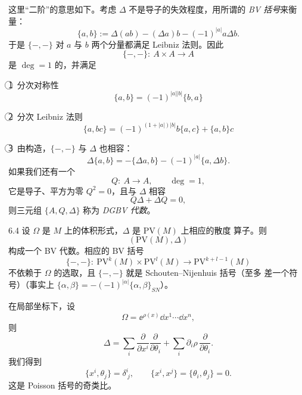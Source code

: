 这里“二阶”的意思如下。考虑 $\Delta$ 不是导子的失效程度，用所谓的
\emph{BV 括号}来衡量：
\[
  \{a,b\}:=\Delta(ab)-(\Delta a)b-(-1)^{|a|}a\Delta b.
\]
于是 $\{-,-\}$ 对 $a$ 与 $b$ 两个分量都满足 Leibniz 法则。因此
\[
  \{-,-\}:\ A\times A\longrightarrow A
\]
是 $\deg=1$ 的，并满足

\textcircled{1}\ 分次对称性
\[
  \{a,b\}=(-1)^{|a||b|}\{b,a\}
\]

\textcircled{2}\ 分次 Leibniz 法则
\[
  \{a,bc\}=(-1)^{(1+|a|)|b|}b\{a,c\}+\{a,b\}c
\]

\textcircled{3}\ 由构造，$\{-,-\}$ 与 $\Delta$ 也相容：
\[
  \Delta\{a,b\}=-\{\Delta a,b\}-(-1)^{|a|}\{a,\Delta b\}.
\]
如果我们还有一个
\[
  Q:\ A\longrightarrow A,\qquad \deg=1,
\]
它是导子、平方为零 $Q^2=0$，且与 $\Delta$ 相容
\[
  Q\Delta+\Delta Q=0,
\]
则三元组 $\{A,Q,\Delta\}$ 称为 \emph{DGBV 代数}。



\begin{wexam}{6.4}
设 $\Omega$ 是 $M$ 上的体积形式，$\Delta$ 是 $\mathrm{PV}(M)$ 上相应的散度
算子。则
\[
  (\mathrm{PV}(M),\Delta)
\]
构成一个 BV 代数。相应的 BV 括号
\[
  \{-,-\}:\ \mathrm{PV}^k(M)\times\mathrm{PV}^l(M)
  \longrightarrow\mathrm{PV}^{k+l-1}(M)
\]
不依赖于 $\Omega$ 的选取，且 $\{-,-\}$ 就是 Schouten--Nijenhuis 括号（至多
差一个符号）（事实上
$\{\alpha,\beta\}=-(-1)^{|\alpha|}\{\alpha,\beta\}_{SN}$）。

在局部坐标下，设
\[
  \Omega=\ee^{\rho(x)}\dd x^1\cdots\dd x^n,
\]
则
\[
  \Delta=\sum_i\frac{\partial}{\partial x^i}
  \frac{\partial}{\partial\theta_i}
  +\sum_i\partial_i\rho\,\frac{\partial}{\partial\theta_i}.
\]
我们得到
\[
  \{x^i,\theta_j\}=\delta^i_{\ j},
  \qquad
  \{x^i,x^j\}=\{\theta_i,\theta_j\}=0.
\]
这是 Poisson 括号的奇类比。
\end{wexam}



